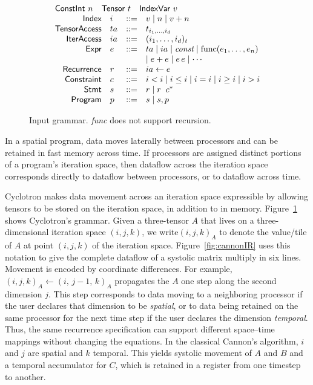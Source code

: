 \documentclass[sigplan, nonacm]{acmart}
\begin{document}
\newcommand{\bnfdef}{\mathrel{::=}}
\newcommand{\bnfalt}{\mathrel{\mid}}
\begin{figure}[t]
\centering
\small
\[
\begin{array}{rlcl}
    \multicolumn{4}{l}{\textsf{ConstInt}~n \quad \textsf{Tensor}~t \quad \textsf{IndexVar}~v} \\
    \textsf{Index}        & i  & \bnfdef & v \bnfalt n \bnfalt v+n \\
    \textsf{TensorAccess} & ta & \bnfdef & t_{i_1,\ldots,i_d} \\
    \textsf{IterAccess}   & ia & \bnfdef & (i_1,\ldots,i_d)_t \\
    \textsf{Expr}         & e  & \bnfdef & ta \bnfalt ia \bnfalt \textit{const} \bnfalt \operatorname{func}(e_1,\ldots,e_n) \\
                          &    &         & \bnfalt e+e \bnfalt e\,e \bnfalt \cdots \\
    \textsf{Recurrence}   & r  & \bnfdef & ia \leftarrow e \\
    \textsf{Constraint}   & c  & \bnfdef & i < i \bnfalt i \leq i \bnfalt i = i \bnfalt i \geq i \bnfalt i > i \\
    \textsf{Stmt}         & s  & \bnfdef & r \bnfalt r \;\; c^* \\
    \textsf{Program}      & p  & \bnfdef & s \bnfalt s,p
\end{array}
\]
\caption{Input grammar. \emph{func} does not support recursion.}
\label{fig:grammar}
\end{figure}

In a spatial program, data moves laterally between processors and can be retained
in fast memory across time. If processors are assigned distinct portions of a
program's iteration space, then dataflow across the iteration space corresponds
directly to dataflow between processors, or to dataflow across time.




Cyclotron makes data movement across an iteration space expressible by allowing tensors to be stored on the iteration space, in addition to in memory. Figure~\ref{fig:grammar} shows Cyclotron's grammar. Given a three-tensor $A$
that lives on a three-dimensional iteration space $(i,j,k)$, we write$(i,j,k)_{A}$ to denote the value/tile of $A$ at point $(i,j,k)$ of the iteration space. Figure~\ref{fig:cannonIR} uses this notation to give the
complete dataflow of a systolic matrix multiply in six lines. Movement is encoded by coordinate differences. For example, $(i,j,k)_A \leftarrow (i,\,j{-}1,\,k)_{A}$ propagates the $A$ one step along the second
dimension $j$. This step corresponds to data moving to a neighboring processor if the user declares that dimension to be \emph{spatial}, or to data being retained
on the same processor for the next time step if the user declares the dimension \emph{temporal}. Thus, the same recurrence specification can support different space--time
mappings without changing the equations. In the classical Cannon's algorithm, $i$ and $j$  are spatial and $k$ temporal. This yields systolic movement of $A$ and $B$ and a temporal accumulator for $C$, which is retained in a register from one timestep to another. 
\end{document}
